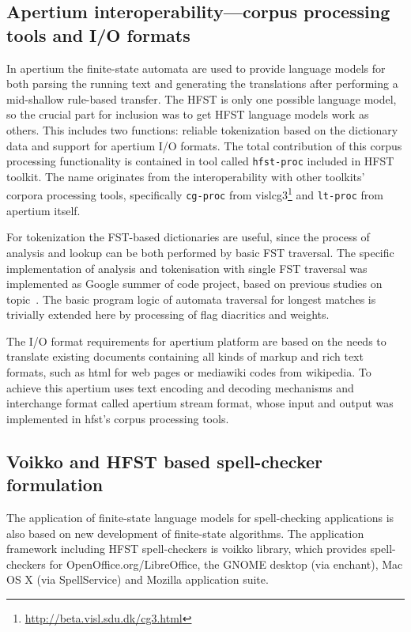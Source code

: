 \documentclass{llncs}
\begin{document}
\subsection{Apertium interoperability---corpus processing tools and I/O formats}

In apertium the finite-state automata are used to provide language models for
both parsing the running text and generating the translations after performing
a mid-shallow rule-based transfer. The HFST is only one possible language
model, so the crucial part for inclusion was to get HFST language models
work as others. This includes two functions: reliable tokenization based on
the dictionary data and support for apertium I/O formats. The total
contribution of this corpus processing functionality is contained in tool
called \texttt{hfst-proc} included in HFST toolkit. The name originates from
the interoperability with other toolkits' corpora processing tools, specifically
\texttt{cg-proc} from vislcg3\footnote{\url{http://beta.visl.sdu.dk/cg3.html}} and
\texttt{lt-proc} from apertium itself.

For tokenization the FST-based dictionaries are useful, since the process of
analysis and lookup can be both performed by basic FST traversal. The specific
implementation of analysis and tokenisation with single FST traversal was
implemented as Google summer of code project, based on previous studies on
topic~\cite{garrido-alenda/2002}. The basic program logic of automata traversal
for longest matches is trivially extended here by processing of flag diacritics
and weights.

The I/O format requirements for apertium platform are based on the needs to
translate existing documents containing all kinds of markup and rich text
formats, such as html for web pages or mediawiki codes from wikipedia. To
achieve this apertium uses text encoding and decoding mechanisms and
interchange format called apertium stream format, whose input and output
was implemented in hfst's corpus processing tools.

\subsection{Voikko and HFST based spell-checker formulation}\label{spellcheck}

The application of finite-state language models for spell-checking applications
is also based on new development of finite-state algorithms. The application
framework including HFST spell-checkers is voikko library, which provides
spell-checkers for OpenOffice.org/LibreOffice, the GNOME desktop (via
enchant), Mac OS X (via SpellService) and Mozilla application suite.
\end{document}
